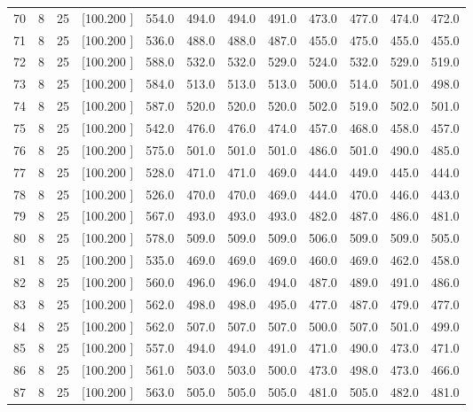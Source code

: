 \documentclass[12pt,a4paper]{article}
\begin{document}
\begin{center}
{\begin{tabular}{r r r r r r r r r r r r}
  70&  8& 25&[100.200   ]&   554.0&   494.0&   494.0&   491.0&   473.0&   477.0&   474.0&   472.0\\[-0.02in]
  71&  8& 25&[100.200   ]&   536.0&   488.0&   488.0&   487.0&   455.0&   475.0&   455.0&   455.0\\[-0.02in]
  72&  8& 25&[100.200   ]&   588.0&   532.0&   532.0&   529.0&   524.0&   532.0&   529.0&   519.0\\[-0.02in]
  73&  8& 25&[100.200   ]&   584.0&   513.0&   513.0&   513.0&   500.0&   514.0&   501.0&   498.0\\[-0.02in]
  74&  8& 25&[100.200   ]&   587.0&   520.0&   520.0&   520.0&   502.0&   519.0&   502.0&   501.0\\[-0.02in]
  75&  8& 25&[100.200   ]&   542.0&   476.0&   476.0&   474.0&   457.0&   468.0&   458.0&   457.0\\[-0.02in]
  76&  8& 25&[100.200   ]&   575.0&   501.0&   501.0&   501.0&   486.0&   501.0&   490.0&   485.0\\[-0.02in]
  77&  8& 25&[100.200   ]&   528.0&   471.0&   471.0&   469.0&   444.0&   449.0&   445.0&   444.0\\[-0.02in]
  78&  8& 25&[100.200   ]&   526.0&   470.0&   470.0&   469.0&   444.0&   470.0&   446.0&   443.0\\[-0.02in]
  79&  8& 25&[100.200   ]&   567.0&   493.0&   493.0&   493.0&   482.0&   487.0&   486.0&   481.0\\[-0.02in]
  80&  8& 25&[100.200   ]&   578.0&   509.0&   509.0&   509.0&   506.0&   509.0&   509.0&   505.0\\[-0.02in]
  81&  8& 25&[100.200   ]&   535.0&   469.0&   469.0&   469.0&   460.0&   469.0&   462.0&   458.0\\[-0.02in]
  82&  8& 25&[100.200   ]&   560.0&   496.0&   496.0&   494.0&   487.0&   489.0&   491.0&   486.0\\[-0.02in]
  83&  8& 25&[100.200   ]&   562.0&   498.0&   498.0&   495.0&   477.0&   487.0&   479.0&   477.0\\[-0.02in]
  84&  8& 25&[100.200   ]&   562.0&   507.0&   507.0&   507.0&   500.0&   507.0&   501.0&   499.0\\[-0.02in]
  85&  8& 25&[100.200   ]&   557.0&   494.0&   494.0&   491.0&   471.0&   490.0&   473.0&   471.0\\[-0.02in]
  86&  8& 25&[100.200   ]&   561.0&   503.0&   503.0&   500.0&   473.0&   498.0&   473.0&   466.0\\[-0.02in]
  87&  8& 25&[100.200   ]&   563.0&   505.0&   505.0&   505.0&   481.0&   505.0&   482.0&   481.0\\[-0.02in]

\end{tabular}}
\end{center}
\end{document}
